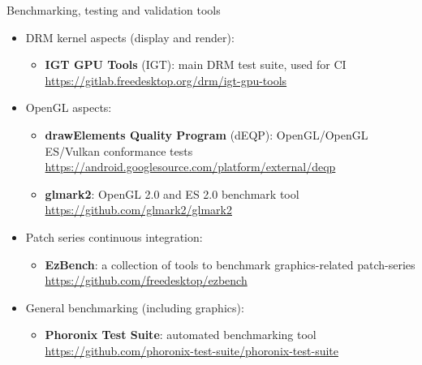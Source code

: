 \begin{frame}{Benchmarking, testing and validation tools}
  \begin{itemize}
  \item DRM kernel aspects (display and render):
    \begin{itemize}
    \item \textbf{IGT GPU Tools} (IGT): main DRM test suite, used for CI\\
      \url{https://gitlab.freedesktop.org/drm/igt-gpu-tools}
    \end{itemize}
  \item OpenGL aspects:
    \begin{itemize}
    \item \textbf{drawElements Quality Program} (dEQP): OpenGL/OpenGL ES/Vulkan conformance tests\\
      \url{https://android.googlesource.com/platform/external/deqp}
    \item \textbf{glmark2}: OpenGL 2.0 and ES 2.0 benchmark tool\\
      \url{https://github.com/glmark2/glmark2}
    \end{itemize}
  \item Patch series continuous integration:
    \begin{itemize}
    \item \textbf{EzBench}: a collection of tools to benchmark graphics-related patch-series\\
      \url{https://github.com/freedesktop/ezbench}
    \end{itemize}
  \item General benchmarking (including graphics):
    \begin{itemize}
    \item \textbf{Phoronix Test Suite}: automated benchmarking tool\\
      \url{https://github.com/phoronix-test-suite/phoronix-test-suite}
    \end{itemize}
  \end{itemize}
\end{frame}
